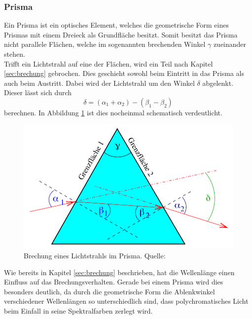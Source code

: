 \subsubsection*{Prisma}
\label{sec:prisma}
Ein Prisma ist ein optisches Element, welches die geometrische Form eines Prismas mit einem Dreieck als Grundfläche
besitzt. Somit besitzt das Prisma nicht parallele Flächen, welche im sogenannten
brechenden Winkel $\gamma$ zueinander stehen. 
\\\noindent
Trifft ein Lichtstrahl auf eine der Flächen, wird ein Teil nach Kapitel
\ref{sec:brechung} gebrochen. Dies geschieht sowohl beim Eintritt in das Prisma als auch beim Austritt. Dabei wird 
der Lichtstrahl um den Winkel $\delta$ abgelenkt. Dieser lässt sich durch 
\begin{equation}
    \delta=(\alpha_1+\alpha_2)-(\beta_1-\beta_2)
    \label{eqn:ablenkwinkel}
\end{equation}
berechnen. In Abbildung \ref{fig:prisma2} ist dies nocheinmal schematisch verdeutlicht.
\begin{figure}[H]
    \centering
    \includegraphics[scale = 0.4]{pictures/Prisma.png}
    \caption{Brechung eines Lichtstrahls im Prisma. Quelle: \cite{AP01}}
    \label{fig:prisma2}
\end{figure}
\noindent
Wie bereits in Kapitel \ref{sec:brechung} beschrieben, hat die Wellenlänge einen Einfluss auf das Brechungsverhalten.
Gerade bei einem Prisma wird dies besonders deutlich, da durch die geometrische Form die Ablenkwinkel verschiedener 
Wellenlängen so unterschiedlich sind, dass polychromatisches Licht beim Einfall in seine Spektralfarben zerlegt wird.

